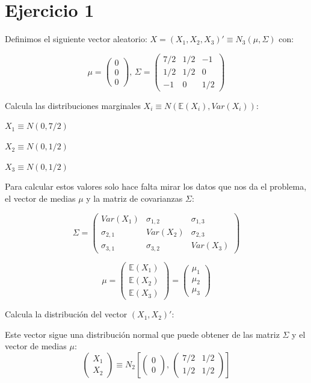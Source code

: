 \documentclass[palatino,nochap]{apuntes}
\begin{document}
\section{Ejercicio 1}
Definimos el siguiente vector aleatorio: $X = (X_1,X_2,X_3)' \equiv N_3(\mu, \Sigma)$ con:

\[
\mu=
\left(
\begin{array}{c}
0\\
0\\
0
\end{array}
\right) \text{,       }
\Sigma=
\left(
\begin{array}{ccc}
7/2& 1/2& -1 \\
1/2& 1/2& 0 \\
-1& 0& 1/2
\end{array}
\right)
\]

\ppart Calcula las distribuciones marginales $X_i \equiv N(\mathbb{E}(X_i), Var(X_i))$:

$X_1\equiv N(0, 7/2)$

$X_2\equiv N(0, 1/2)$

$X_3\equiv N(0, 1/2)$

Para calcular estos valores solo hace falta mirar los datos que nos da el problema, el vector de medias $\mu$ y la matriz de covarianzas $\Sigma$:

\[
\Sigma=\left(
\begin{array}{ccc}
Var(X_1)& \sigma_{1,2}& \sigma_{1,3} \\
\sigma_{2,1}& Var(X_2)& \sigma_{2,3} \\
\sigma_{3,1}& \sigma_{3,2}& Var(X_3)
\end{array}
\right)
\]

\[
\mu=
\left(
\begin{array}{c}
\mathbb{E}(X_1)\\
\mathbb{E}(X_2)\\
\mathbb{E}(X_3)
\end{array}
\right)=
\left(
\begin{array}{c}
\mu_1\\
\mu_2\\
\mu_3
\end{array}
\right)
\]

\ppart Calcula la distribución del vector $(X_1,X_2)'$:

Este vector sigue una distribución normal que puede obtener de las matriz $\Sigma$ y el vector de medias $\mu$:
\[
\left(
\begin{array}{c}
X_1\\
X_2
\end{array}
\right)
\equiv N_2\left[
\left(
\begin{array}{c}
0\\
0
\end{array}
\right)
\text{, }
\left(
\begin{array}{cc}
7/2& 1/2 \\
1/2 & 1/2
\end{array}
\right)
\right]
\]
\end{document}
